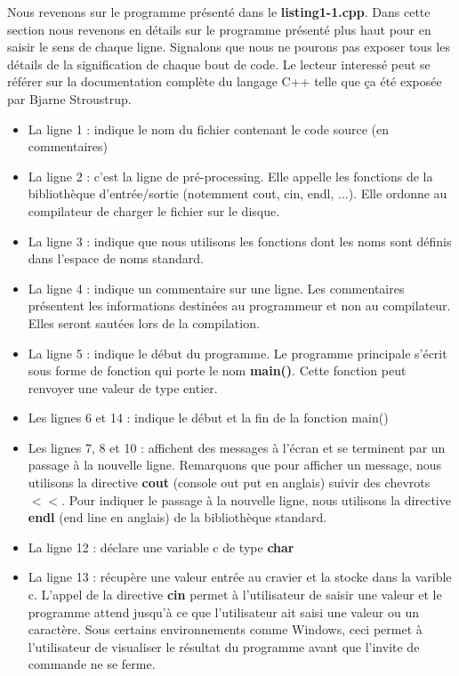 \documentclass[a4paper, oneside,11pt]{book}
\begin{document}
Nous revenons sur le programme pr\'esent\'e dans le \textbf{listing1-1.cpp}. Dans cette section nous revenons en d\'etails  sur le programme pr\'esent\'e plus haut pour en saisir 
le sens de chaque ligne. Signalons que nous ne pourons pas exposer tous les d\'etails de la signification de chaque bout de code. Le  lecteur  interess\'e peut se r\'ef\'erer sur la 
documentation compl\`ete du langage C++ telle que \c{c}a \'et\'e expos\'ee  par Bjarne Stroustrup.
\begin{itemize}
\item La ligne 1 : indique le nom du fichier contenant le code source (en commentaires)
\item La ligne 2 : c'est la ligne de pr\'e-processing. Elle appelle les fonctions de la biblioth\`eque d'entr\'ee/sortie (notemment cout, cin, endl, ...). Elle ordonne au compilateur
de charger le fichier sur le disque.
\item La ligne 3 : indique que nous utilisons les fonctions dont les noms sont d\'efinis dans l'espace de noms standard.
\item La ligne 4 : indique un commentaire sur une ligne. Les  commentaires pr\'esentent les informations destin\'ees au programmeur et non au compilateur. Elles seront saut\'ees lors
de la compilation.
\item La ligne 5 : indique le d\'ebut du programme. Le programme principale s'\'ecrit sous forme de fonction qui porte le nom \textbf{main()}. Cette fonction peut renvoyer une  valeur 
de type entier.
\item Les lignes 6 et 14 : indique le d\'ebut et la fin de la fonction main()
\item Les lignes 7, 8 et 10 : affichent des messages \`a l'\'ecran et se  terminent par un passage \`a la nouvelle ligne. Remarquons que pour afficher un message, 
nous utilisons la directive \textbf{cout} (console out put en anglais)  suivir des chevrots $<<$. Pour  indiquer le passage \`a la nouvelle ligne, nous utilisons 
la directive \textbf{endl} (end line en anglais) de la biblioth\`eque standard.
\item La ligne 12 : d\'eclare une variable c de type \textbf{char}
\item La ligne 13 : r\'ecup\`ere une valeur entr\'ee au cravier et la stocke dans la varible c. L'appel de la directive \textbf{cin} permet \`a l'utilisateur de saisir une valeur et le 
programme attend jusqu'\`a ce que l'utilisateur ait saisi une valeur ou un caract\`ere. Sous certains environnements comme Windows, ceci permet \`a l'utilisateur de visualiser le 
r\'esultat du programme avant que l'invite de  commande ne se  ferme.

\end{itemize}
\end{document}
